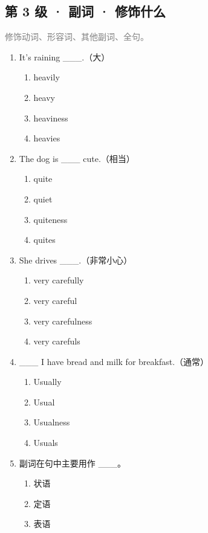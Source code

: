 \documentclass[11pt,a4paper]{ctexart}
\begin{document}
\subsection*{第 3 级 · 副词 · 修饰什么}
\noindent\textcolor{gray}{修饰动词、形容词、其他副词、全句。}\par\smallskip
\begin{enumerate}[leftmargin=*,itemsep=4pt]
\item It’s raining \_\_\_.（大）
\begin{enumerate}[label=\Alph*.,leftmargin=2em,itemsep=1pt,topsep=2pt]
\item heavily
\item heavy
\item heaviness
\item heavies
\end{enumerate}
\item The dog is \_\_\_ cute.（相当）
\begin{enumerate}[label=\Alph*.,leftmargin=2em,itemsep=1pt,topsep=2pt]
\item quite
\item quiet
\item quiteness
\item quites
\end{enumerate}
\item She drives \_\_\_.（非常小心）
\begin{enumerate}[label=\Alph*.,leftmargin=2em,itemsep=1pt,topsep=2pt]
\item very carefully
\item very careful
\item very carefulness
\item very carefuls
\end{enumerate}
\item \_\_\_ I have bread and milk for breakfast.（通常）
\begin{enumerate}[label=\Alph*.,leftmargin=2em,itemsep=1pt,topsep=2pt]
\item Usually
\item Usual
\item Usualness
\item Usuals
\end{enumerate}
\item 副词在句中主要用作 \_\_\_。
\begin{enumerate}[label=\Alph*.,leftmargin=2em,itemsep=1pt,topsep=2pt]
\item 状语
\item 定语
\item 表语

\end{enumerate}
\end{enumerate}
\end{document}
